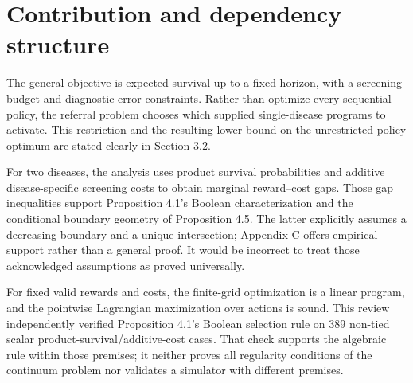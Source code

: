 \documentclass[10pt]{article}
\begin{document}
\section*{Contribution and dependency structure}
The general objective is expected survival up to a fixed horizon, with a screening budget and diagnostic-error constraints. Rather than optimize every sequential policy, the referral problem chooses which supplied single-disease programs to activate. This restriction and the resulting lower bound on the unrestricted policy optimum are stated clearly in Section 3.2.\par
For two diseases, the analysis uses product survival probabilities and additive disease-specific screening costs to obtain marginal reward–cost gaps. Those gap inequalities support Proposition 4.1’s Boolean characterization and the conditional boundary geometry of Proposition 4.5. The latter explicitly assumes a decreasing boundary and a unique intersection; Appendix C offers empirical support rather than a general proof. It would be incorrect to treat those acknowledged assumptions as proved universally.\par
For fixed valid rewards and costs, the finite-grid optimization is a linear program, and the pointwise Lagrangian maximization over actions is sound. This review independently verified Proposition 4.1’s Boolean selection rule on 389 non-tied scalar product-survival/additive-cost cases. That check supports the algebraic rule within those premises; it neither proves all regularity conditions of the continuum problem nor validates a simulator with different premises.\par
\end{document}

